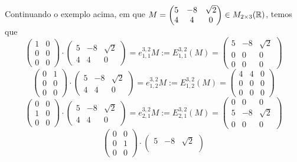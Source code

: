 \begin{ex}
	Continuando o exemplo acima, em que $M=\begin{pmatrix}
	5 & -8 & \sqrt 2\\
	4 & 4 & 0
	\end{pmatrix}\in M_{2\times 3}(\mathbb R)$, temos que
	\[\begin{pmatrix}
	1 & 0\\
	0&0\\
	0&0
	\end{pmatrix}\cdot \begin{pmatrix}
	5 & -8 & \sqrt 2\\
	4 & 4 & 0
	\end{pmatrix}=e^{3,2}_{1,1}M:=E^{3,2}_{1,1}(M)=\begin{pmatrix}
	5 & -8 & \sqrt2\\
	0&0&0\\
	0&0&0
	\end{pmatrix}\]
	\[\begin{pmatrix}
	0&1\\
	0&0\\
	0&0
	\end{pmatrix}\cdot \begin{pmatrix}
	5 & -8 & \sqrt 2\\
	4 & 4 & 0
	\end{pmatrix}=e^{3,2}_{1,2}M:=E^{3,2}_{1,2}(M)=\begin{pmatrix}
	4 & 4&0\\
	0&0&0\\
	0&0&0
	\end{pmatrix}\]
	\[\begin{pmatrix}
	0&0\\
	1&0\\
	0&0
	\end{pmatrix}\cdot \begin{pmatrix}
	5 & -8 & \sqrt 2\\
	4 & 4 & 0
	\end{pmatrix}=e^{3,2}_{2,1}M:=E^{3,2}_{2,1}(M)=\begin{pmatrix}
	0&0&0\\
	5 & -8 & \sqrt2\\	
	0&0&0
	\end{pmatrix}\]
	\[\begin{pmatrix}
	0 & 0\\
	0&1\\
	0&0
	\end{pmatrix}\cdot \begin{pmatrix}
	5 & -8 & \sqrt 2\\

\end{pmatrix}\]
\end{ex}
